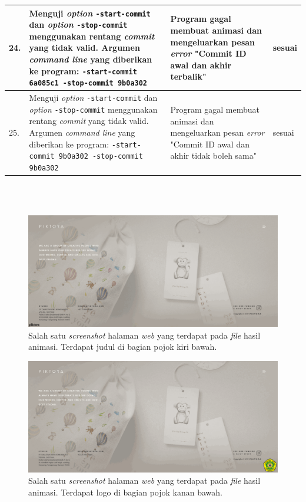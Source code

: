 \begin{table}[htbp]
\begin{tabular}{|p{0.3cm}|>{\raggedright} p{7 cm}| p{5.5 cm}| p{3 cm}|}
		24. & Menguji \textit{option} \texttt{-start-commit} dan \textit{option} \texttt{-stop-commit} menggunakan rentang \textit{commit} yang tidak valid. Argumen \textit{command line} yang diberikan ke program: \texttt{-start-commit 6a085c1 -stop-commit 9b0a302} & Program gagal membuat animasi dan mengeluarkan pesan \textit{error} "Commit ID awal dan akhir terbalik"  & sesuai\\ \hline
		25. & Menguji \textit{option} \texttt{-start-commit} dan \textit{option} \texttt{-stop-commit} menggunakan rentang \textit{commit} yang tidak valid. Argumen \textit{command line} yang diberikan ke program: \texttt{-start-commit 9b0a302  -stop-commit 9b0a302} & Program gagal membuat animasi dan mengeluarkan pesan \textit{error} "Commit ID awal dan akhir tidak boleh sama" & sesuai  \\ \hline
\end{tabular}
	\label{table:hasil_pengujian3}
\end{table}


\ \\
\ \\
\begin{figure}[H]
	\centering
		\includegraphics[scale=0.3]{Gambar/title.png}
	\caption{Salah satu \textit{screenshot} halaman \textit{web} yang terdapat pada \textit{file} hasil animasi. Terdapat judul di bagian pojok kiri bawah.}
	\label{fig:title}
\end{figure}


\begin{figure}[H]
	\centering
		\includegraphics[scale=0.3]{Gambar/logo.png}
	\caption{Salah satu \textit{screenshot} halaman \textit{web} yang terdapat pada \textit{file} hasil animasi. Terdapat logo di bagian pojok kanan bawah.}
	\label{fig:logo}
\end{figure}

